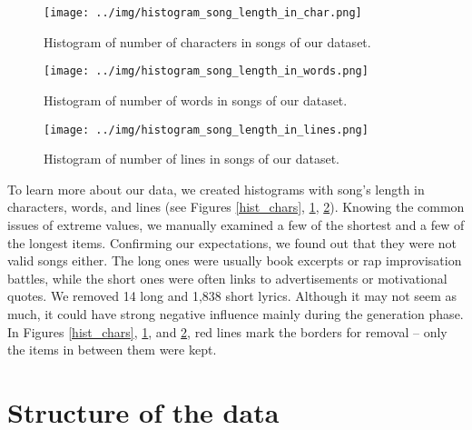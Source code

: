 \begin{figure}[!htb]
	\texttt{[image: ../img/histogram\_song\_length\_in\_char.png]}
	\caption{Histogram of number of characters in songs of our dataset.}\label{hist_chars}
	\endminipage\hfill
	\texttt{[image: ../img/histogram\_song\_length\_in\_words.png]}
	\caption{Histogram of number of words in songs of our dataset.}\label{hist_words}
	\endminipage\hfill
	
\end{figure}
\begin{figure}[!h]\centering
	\texttt{[image: ../img/histogram\_song\_length\_in\_lines.png]}
	\caption{Histogram of number of lines in songs of our dataset.}\label{hist_lines}
	\endminipage\hfill
\end{figure}

To learn more about our data, we created histograms with song's length in characters, words, and lines (see Figures \ref{hist_chars}, \ref{hist_words}, \ref{hist_lines}). Knowing the common issues of extreme values, we manually examined a few of the shortest and a few of the longest items. Confirming our expectations, we found out that they were not valid songs either. The long ones were usually book excerpts or rap improvisation battles, while the short ones were often links to advertisements or motivational quotes. We removed 14 long and 1,838 short lyrics. Although it may not seem as much, it could have strong negative influence mainly during the generation phase. In Figures \ref{hist_chars}, \ref{hist_words}, and \ref{hist_lines}, red lines mark the borders for removal -- only the items in between them were kept.

\section{Structure of the data}


